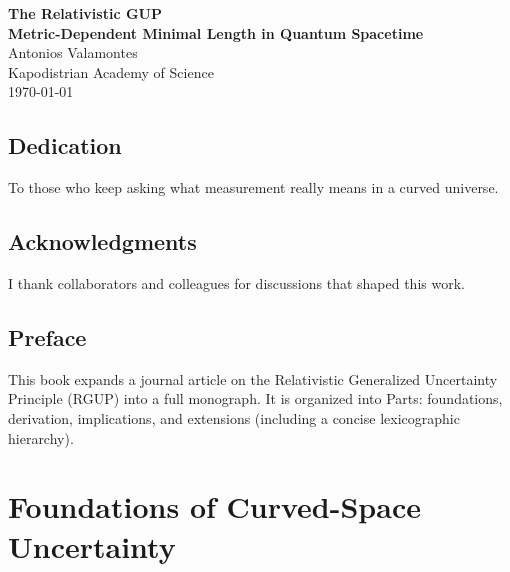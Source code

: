 \documentclass[11pt,oneside]{book}
\numberwithin{equation}{chapter}
\begin{document}
\thispagestyle{empty}
\vspace*{2.2cm}
\begin{center}
{\huge \textbf{The Relativistic GUP}}\\[6pt]
{\Large \textbf{Metric-Dependent Minimal Length in Quantum Spacetime}}\\[18pt]
{\large Antonios Valamontes}\\[4pt]
{\small Kapodistrian Academy of Science}\\[24pt]
{\small \today}
\end{center}
\clearpage

\chapter*{Dedication}
To those who keep asking what measurement really means in a curved universe.
\clearpage

\chapter*{Acknowledgments}
I thank collaborators and colleagues for discussions that shaped this work.
\clearpage

\chapter*{Preface}
This book expands a journal article on the Relativistic Generalized Uncertainty Principle (RGUP) into a full monograph. 
It is organized into Parts: foundations, derivation, implications, and extensions (including a concise lexicographic hierarchy).
\clearpage

\tableofcontents
\clearpage

\part{Foundations of Curved-Space Uncertainty}
\end{document}
